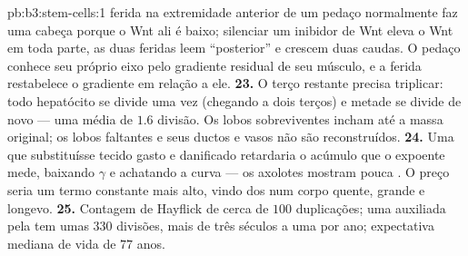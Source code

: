 \begin{solution}{pb:b3:stem-cells:1}
ferida na extremidade anterior de um pedaço normalmente faz uma cabeça
porque o Wnt ali é baixo; silenciar um inibidor de Wnt eleva o Wnt em
toda parte, as duas feridas leem ``posterior'' e crescem duas caudas. O
pedaço conhece seu próprio eixo pelo gradiente residual de seu músculo, e
a ferida restabelece o gradiente em relação a ele.
\textbf{23.} O terço restante precisa triplicar: todo hepatócito se
divide uma vez (chegando a dois terços) e metade se divide de novo ---
uma média de $1.6$ divisão. Os lobos sobreviventes incham até a massa
original; os lobos faltantes e seus ductos e vasos não são reconstruídos.
\textbf{24.} Uma  que substituísse tecido gasto e danificado
retardaria o acúmulo que o expoente mede, baixando $\gamma$ e achatando a
curva --- os axolotes mostram pouca . O preço seria um termo
constante mais alto, vindo dos  num corpo quente, grande e
longevo.
\textbf{25.} Contagem de Hayflick de cerca de $100$ duplicações; uma
 auxiliada pela  tem umas $330$ divisões, mais de
três séculos a uma por ano; expectativa mediana de vida de $77$ anos.
\end{solution}
